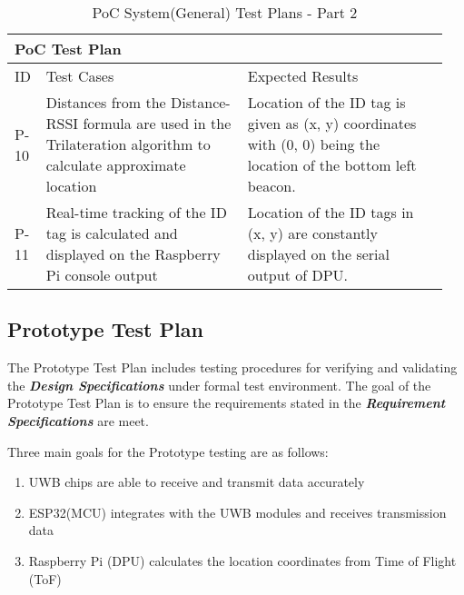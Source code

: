 \begin{table}[h!]
    \centering
    
    \begin{tabular}{|m{0.05\linewidth}|m{0.45\linewidth}|m{0.45\linewidth}|} 
    \hline
    \multicolumn{3}{|l|}{\textbf{PoC Test Plan}}  \\ 
    \hline
    ID & Test Cases & Expected Results\\ 
    \hline
    
    P-10
    &  Distances from the Distance-RSSI formula are used in the Trilateration algorithm to calculate approximate location
    &  Location of the ID tag is given as (x, y) coordinates with (0, 0) being the location of the bottom left beacon. \\ 
    \hline

    P-11
    & Real-time tracking of the ID tag is calculated and displayed on the Raspberry Pi console output
    & Location of the ID tags in (x, y) are constantly displayed on the serial output of DPU. \\ 
    \hline

    \end{tabular}
    \caption{PoC System(General) Test Plans - Part 2}
\end{table}

\pagebreak
\subsection{Prototype Test Plan}

The Prototype Test Plan includes testing procedures for verifying and validating the \textbf{\textit{Design Specifications}} under formal test environment. The goal of the Prototype Test Plan is to ensure the requirements stated in the  \textbf{\textit{Requirement Specifications}} are meet.

\medskip
Three main goals for the Prototype testing are as follows:
\begin{enumerate}
    \item UWB chips are able to receive and transmit data accurately
    \item ESP32(MCU) integrates with the UWB modules and receives transmission data 
    \item Raspberry Pi (DPU) calculates the location coordinates from Time of Flight (ToF)
\end{enumerate}


